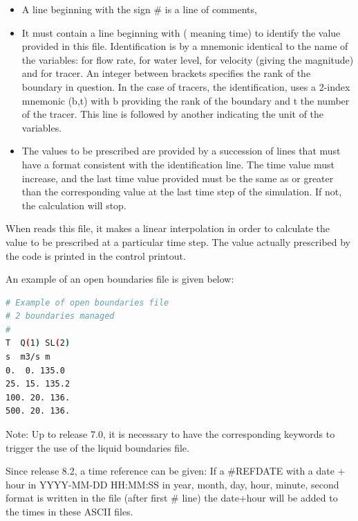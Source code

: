 \begin{itemize}
\item A line beginning with the sign \# is a line of comments,

\item It must contain a line beginning with  ( meaning
time) to identify the value provided in this file.
Identification is by a mnemonic identical to the name of the variables:
 for flow rate,  for water level, 
for velocity (giving the magnitude) and  for tracer.
An integer between brackets specifies the rank of the boundary in question.
In the case of tracers, the identification, uses a 2-index mnemonic
(b,t) with b providing the rank of the boundary and t the number of
the tracer.
This line is followed by another indicating the unit of the variables.

\item The values to be prescribed are provided by a succession of lines
that must have a format consistent with the identification line.
The time value must increase, and the last time value provided must be the same
as or greater than the corresponding value at the last time step of the
simulation.
If not, the calculation will stop.
\end{itemize}

When  reads this file, it makes a linear interpolation in order to
calculate the value to be prescribed at a particular time step.
The value actually prescribed by the code is printed in the control printout.

An example of an open boundaries file is given below:
\begin{lstlisting}[language=bash]
# Example of open boundaries file
# 2 boundaries managed
#
T  Q(1) SL(2)
s  m3/s m
0.  0. 135.0
25. 15. 135.2
100. 20. 136.
500. 20. 136.
\end{lstlisting}
\begin{WarningBlock}{Note:}
Up to release 7.0, it is necessary to have the corresponding keywords
 to trigger the use of the liquid boundaries file.
\end{WarningBlock}

Since release 8.2, a time reference can be given:
If a \#REFDATE with a date + hour in YYYY-MM-DD HH:MM:SS
in year, month, day, hour, minute, second format is written in the file (after first \# line)
the date+hour will be added to the times in these ASCII files.

